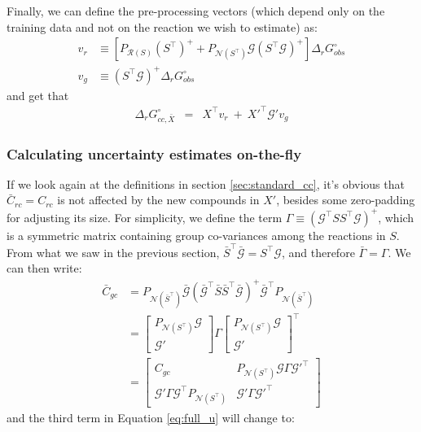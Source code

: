 \documentclass[twocolumn]{article}
\newcommand{\Gmat}{\mathcal{G}}
\newcommand{\PRmat}[1]{P_{\mathcal{R}\left(#1\right)}}
\newcommand{\PNmat}[1]{P_{\mathcal{N}\left(#1\right)}}
\begin{document}
Finally, we can define the pre-processing vectors (which depend only on the training data and not on the reaction we wish to estimate) as:
\begin{align*}
	v_{r} &\equiv
	\left[
		\PRmat{S} \left(S^{\top}\right)^{+} + 
		\PNmat{S^\top} \Gmat \left(S^{\top}\Gmat\right)^{+}
	\right]
	\Delta_{r}G_{obs}^{\circ}
\\
	v_g &\equiv \left(S^{\top}\Gmat\right)^{+} \Delta_{r}G_{obs}^{\circ}
\end{align*}
and get that
\begin{eqnarray}
\Delta_{r}G_{cc,\bar{X}}^{\circ} &=& X^\top v_r ~+~ X'^\top \Gmat' v_g
\end{eqnarray}

\subsubsection{Calculating uncertainty estimates on-the-fly}
If we look again at the definitions in section \ref{sec:standard_cc}, it's obvious that $\bar{C}_{rc} = C_{rc}$ is not affected by the new compounds in $X'$, besides some zero-padding for adjusting its size. For simplicity, we define the term $\Gamma \equiv \left(\Gmat^{\top}SS^{\top}\Gmat\right)^{+}$, which is a symmetric matrix containing group co-variances among the reactions in $S$. From what we saw in the previous section, $\bar{S}^\top \bar{\Gmat} = S^\top \Gmat$, and therefore $\bar{\Gamma} = \Gamma$. We can then write:
\begin{align}
	\bar{C}_{gc} &= \PNmat{\bar{S}^\top} \bar{\Gmat} \left(\bar{\Gmat}^{\top}\bar{S}\bar{S}^{\top}\bar{\Gmat}\right)^{+} \bar{\Gmat}^{\top} \PNmat{\bar{S}^\top} \nonumber\\
	&= \begin{bmatrix} \PNmat{S^\top} \Gmat \\ \Gmat' \end{bmatrix}
	\Gamma
	\begin{bmatrix} \PNmat{S^\top} \Gmat \\ \Gmat' \end{bmatrix}^\top
\nonumber\\
&=
 \begin{bmatrix} 
 C_{gc} & \PNmat{S^\top} \Gmat \Gamma \Gmat'^\top \\ 
 \Gmat' \Gamma \Gmat^\top \PNmat{S^\top} & \Gmat' \Gamma \Gmat'^\top \end{bmatrix}
\end{align}
and the third term in Equation \ref{eq:full_u} will change to:
\end{document}
